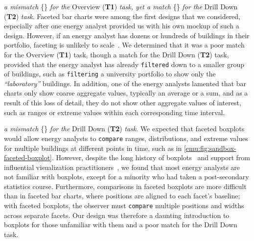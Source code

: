  {\it a mismatch} \{\mismatch\} {\it for the} Overview ({\bf T1}) {\it task, yet a match} \{\match\} {\it for the} Drill Down ({\bf T2}) {\it task}.
Faceted bar charts were among the first designs that we considered, especially after one energy analyst provided us with his own mockup of such a design.
However, if an energy analyst has dozens or hundreds of buildings in their portfolio, faceting is unlikely to scale~\cite{Javed2010}. 
We determined that it was a poor match for the Overview ({\bf T1}) task, though a match for the Drill Down ({\bf T2}) task, provided that the energy analyst has already {\tt filtered} down to a smaller group of buildings, such as {\tt filtering} a university portfolio to show only the {\it ``laboratory''} buildings.
In addition, one of the energy analysts lamented that bar charts only show coarse aggregate values, typically an average or a sum, and as a result of this loss of detail, they do not show other aggregate values of interest, such as ranges or extreme values within each corresponding time interval.

 {\it a mismatch} \{\mismatch\} {\it for the} Drill Down ({\bf T2}) {\it task}.
We expected that faceted boxplots would allow energy analysts to {\tt compare} ranges, distributions, and extreme values for multiple buildings at different points in time, such as in \autoref{emu:fig:sandbox-faceted-boxplot}.
However, despite the long history of boxplots~\cite{Wickham2011} and support from influential visualization practitioners~\cite{Few2014}, we found that most energy analysts are not familiar with boxplots, except for a minority who had taken a post-secondary statistics course.
Furthermore, comparisons in faceted boxplots are more difficult than in faceted bar charts, where positions are aligned to each facet's baseline; with faceted boxplots, the observer must {\tt compare} multiple positions and widths across separate facets. 
Our design was therefore a daunting introduction to boxplots for those unfamiliar with them and a poor match for the Drill Down task.

